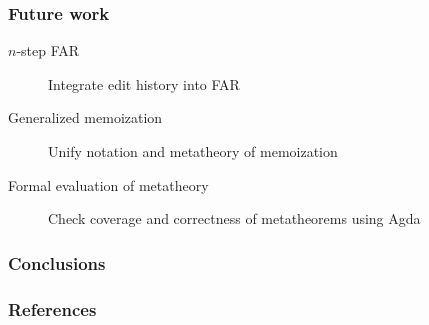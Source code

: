 \documentclass{beamer}
\begin{document}
\begin{frame}
  \frametitle{Future work}

  \begin{description}
  \item[$n$-step FAR] Integrate edit history into FAR
  \item[Generalized memoization] Unify notation and metatheory of memoization
  \item[Formal evaluation of metatheory] Check coverage and correctness of metatheorems using Agda
  \end{description}
\end{frame}


\begin{frame}
  \frametitle{Conclusions}

  
\end{frame}

\begin{frame}[allowframebreaks]
  \frametitle{References}

  \footnotesize
  
  
\end{frame}
\end{document}
